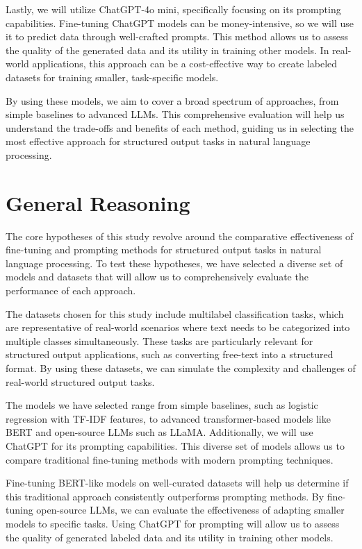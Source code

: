 \documentclass[11pt]{article}
\begin{document}
Lastly, we will utilize ChatGPT-4o mini, specifically focusing on its prompting capabilities. Fine-tuning ChatGPT models can be money-intensive, so we will use it to predict data through well-crafted prompts. This method allows us to assess the quality of the generated data and its utility in training other models. In real-world applications, this approach can be a cost-effective way to create labeled datasets for training smaller, task-specific models.

By using these models, we aim to cover a broad spectrum of approaches, from simple baselines to advanced LLMs. This comprehensive evaluation will help us understand the trade-offs and benefits of each method, guiding us in selecting the most effective approach for structured output tasks in natural language processing.

\section{General Reasoning} 

The core hypotheses of this study revolve around the comparative effectiveness of fine-tuning and prompting methods for structured output tasks in natural language processing. To test these hypotheses, we have selected a diverse set of models and datasets that will allow us to comprehensively evaluate the performance of each approach.

The datasets chosen for this study include multilabel classification tasks, which are representative of real-world scenarios where text needs to be categorized into multiple classes simultaneously. These tasks are particularly relevant for structured output applications, such as converting free-text into a structured format. By using these datasets, we can simulate the complexity and challenges of real-world structured output tasks.

The models we have selected range from simple baselines, such as logistic regression with TF-IDF features, to advanced transformer-based models like BERT and open-source LLMs such as LLaMA. Additionally, we will use ChatGPT for its prompting capabilities. This diverse set of models allows us to compare traditional fine-tuning methods with modern prompting techniques.

Fine-tuning BERT-like models on well-curated datasets will help us determine if this traditional approach consistently outperforms prompting methods. By fine-tuning open-source LLMs, we can evaluate the effectiveness of adapting smaller models to specific tasks. Using ChatGPT for prompting will allow us to assess the quality of generated labeled data and its utility in training other models.
\end{document}
